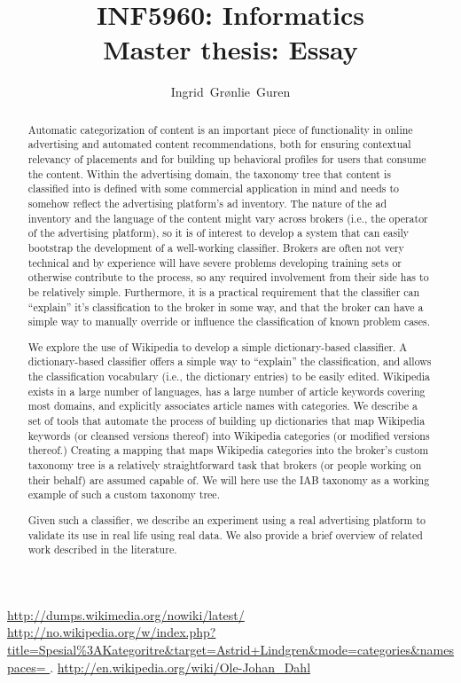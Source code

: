 \documentclass[11pt,english,a4paper]{article}
\title{INF5960: Informatics\\Master thesis: Essay}
\author{\large{\mbox{Ingrid Grønlie Guren}}}
\begin{document}
\ififorside

\urldef\nowikidump\url{http://dumps.wikimedia.org/nowiki/latest/}
\urldef\categorytree\url{http://no.wikipedia.org/w/index.php?title=Spesial%3AKategoritre&target=Astrid+Lindgren&mode=categories&namespaces= }.
\urldef\olejohandahleng\url{http://en.wikipedia.org/wiki/Ole-Johan_Dahl}





\begin{abstract}
Automatic categorization of content is an important piece of functionality in online advertising and automated content recommendations, both for ensuring contextual relevancy of placements and for building up behavioral profiles for users that consume the content. Within the advertising domain, the taxonomy tree that content is classified into is defined with some commercial application in mind and needs to somehow reflect the advertising platform’s ad inventory. The nature of the ad inventory and the language of the content might vary across brokers (i.e., the operator of the advertising platform), so it is of interest to develop a system that can easily bootstrap the development of a well-working classifier. Brokers are often not very technical and by experience will have severe problems developing training sets or otherwise contribute to the process, so any required involvement from their side has to be relatively simple. Furthermore, it is a practical requirement that the classifier can “explain” it’s classification to the broker in some way, and that the broker can have a simple way to manually override or influence the classification of known problem cases.

We explore the use of Wikipedia to develop a simple dictionary-based classifier. A dictionary-based classifier offers a simple way to “explain” the classification, and allows the classification vocabulary (i.e., the dictionary entries) to be easily edited. Wikipedia exists in a large number of languages, has a large number of article keywords covering most domains, and explicitly associates article names with categories. We describe a set of tools that automate the process of building up dictionaries that map Wikipedia keywords (or cleansed versions thereof) into Wikipedia categories (or modified versions thereof.) Creating a mapping that maps Wikipedia categories into the broker’s custom taxonomy tree is a relatively straightforward task that brokers (or people working on their behalf) are assumed capable of. We will here use the IAB taxonomy as a working example of such a custom taxonomy tree.

Given such a classifier, we describe an experiment using a real advertising platform to validate its use in real life using real data. We also provide a brief overview of related work described in the literature.
\end{abstract}
\end{document}
